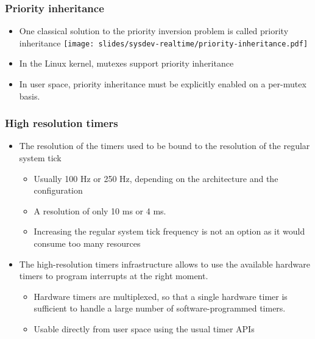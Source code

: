 \begin{frame}
  \frametitle{Priority inheritance}
  \begin{itemize}
  \item One classical solution to the priority inversion problem is
    called priority inheritance
    \texttt{[image: slides/sysdev-realtime/priority-inheritance.pdf]}
  \item In the Linux kernel, mutexes support priority inheritance
  \item In user space, priority inheritance must be explicitly enabled
    on a per-mutex basis.
  \end{itemize}
\end{frame}

\begin{frame}
  \frametitle{High resolution timers}
  \begin{itemize}
  \item The resolution of the timers used to be bound to the
    resolution of the regular system tick
    \begin{itemize}
    \item Usually 100 Hz or 250 Hz, depending on the architecture and
      the configuration
    \item A resolution of only 10 ms or 4 ms.
    \item Increasing the regular system tick frequency is not an
      option as it would consume too many resources
    \end{itemize}
  \item The high-resolution timers infrastructure allows to use
    the available hardware timers to program interrupts
    at the right moment.
    \begin{itemize}
    \item Hardware timers are multiplexed, so that a single hardware
      timer is sufficient to handle a large number of
      software-programmed timers.
    \item Usable directly from user space using the usual timer APIs
    \end{itemize}
  \end{itemize}
\end{frame}

